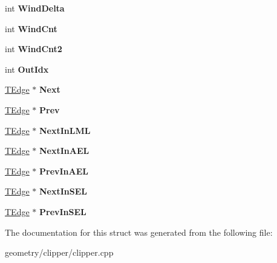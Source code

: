 \begin{DoxyCompactItemize}
int {\bfseries Wind\+Delta}
\item 
\mbox{\label{struct_clipper_lib_1_1_t_edge_ad7df0e20b58e4c6bddcfc7faf0003d4c}} 
int {\bfseries Wind\+Cnt}
\item 
\mbox{\label{struct_clipper_lib_1_1_t_edge_a50ccbb54513e60a39132dfca7c9b40f4}} 
int {\bfseries Wind\+Cnt2}
\item 
\mbox{\label{struct_clipper_lib_1_1_t_edge_a85d226803a3c54dbc983668f430b7e28}} 
int {\bfseries Out\+Idx}
\item 
\mbox{\label{struct_clipper_lib_1_1_t_edge_af63cea19f1590922691d1a3a90e4173d}} 
\mbox{\hyperlink{struct_clipper_lib_1_1_t_edge}{T\+Edge}} $\ast$ {\bfseries Next}
\item 
\mbox{\label{struct_clipper_lib_1_1_t_edge_a2713de57bcc285aaee2b9e1f5023bebc}} 
\mbox{\hyperlink{struct_clipper_lib_1_1_t_edge}{T\+Edge}} $\ast$ {\bfseries Prev}
\item 
\mbox{\label{struct_clipper_lib_1_1_t_edge_a1d0ad253e18e6fc82ed025e3d69b33de}} 
\mbox{\hyperlink{struct_clipper_lib_1_1_t_edge}{T\+Edge}} $\ast$ {\bfseries Next\+In\+L\+ML}
\item 
\mbox{\label{struct_clipper_lib_1_1_t_edge_a7281f59250f53e96099c1f636350bbd5}} 
\mbox{\hyperlink{struct_clipper_lib_1_1_t_edge}{T\+Edge}} $\ast$ {\bfseries Next\+In\+A\+EL}
\item 
\mbox{\label{struct_clipper_lib_1_1_t_edge_a69a6d91641e91d87bf8fb658ab5b80d1}} 
\mbox{\hyperlink{struct_clipper_lib_1_1_t_edge}{T\+Edge}} $\ast$ {\bfseries Prev\+In\+A\+EL}
\item 
\mbox{\label{struct_clipper_lib_1_1_t_edge_a167cd4d991d27f344d875ad6fd43b862}} 
\mbox{\hyperlink{struct_clipper_lib_1_1_t_edge}{T\+Edge}} $\ast$ {\bfseries Next\+In\+S\+EL}
\item 
\mbox{\label{struct_clipper_lib_1_1_t_edge_aa38f572c772d0bae50323f7890334c5f}} 
\mbox{\hyperlink{struct_clipper_lib_1_1_t_edge}{T\+Edge}} $\ast$ {\bfseries Prev\+In\+S\+EL}
\end{DoxyCompactItemize}


The documentation for this struct was generated from the following file\+:\begin{DoxyCompactItemize}
\item 
geometry/clipper/clipper.\+cpp\end{DoxyCompactItemize}
